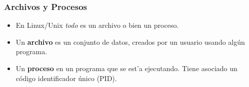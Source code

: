 \documentclass[hyperref={colorlinks}]{beamer}
\begin{document}
\begin{frame}
  \frametitle{Archivos y Procesos}
  \begin{block}{}
  \begin{itemize}
    \item En Linux/Unix \textit{todo} es un archivo o bien un proceso.
    \item Un \textbf{archivo} es un conjunto de datos, creados por un usuario usando alg\'un programa.
    \item Un \textbf{proceso} en un programa que se est'a ejecutando. Tiene asociado un c\'odigo identificador \'unico (PID).
  \end{itemize}
  \end{block}
\end{frame}

\end{document}
